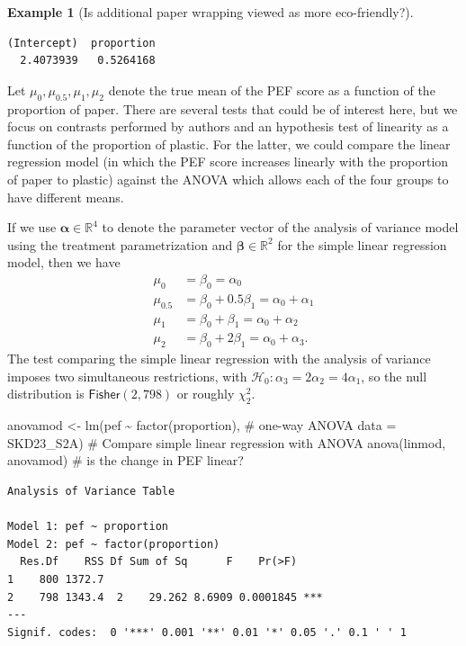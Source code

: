 \documentclass[
  11pt,
  letterpaper,
]{scrbook}
\newenvironment{Shaded}{\begin{snugshade}}{\end{snugshade}}
\newcommand{\AttributeTok}[1]{\textcolor[rgb]{0.40,0.45,0.13}{#1}}
\newcommand{\CommentTok}[1]{\textcolor[rgb]{0.37,0.37,0.37}{#1}}
\newcommand{\FunctionTok}[1]{\textcolor[rgb]{0.28,0.35,0.67}{#1}}
\newcommand{\NormalTok}[1]{\textcolor[rgb]{0.00,0.23,0.31}{#1}}
\newcommand{\OtherTok}[1]{\textcolor[rgb]{0.00,0.23,0.31}{#1}}
\newcommand{\SpecialCharTok}[1]{\textcolor[rgb]{0.37,0.37,0.37}{#1}}
\theoremstyle{definition}
\theoremstyle{definition}
\newtheorem{example}{Example}[chapter]
\theoremstyle{remark}
\begin{document}
\begin{example}[Is additional paper wrapping viewed as more
eco-friendly?]
\begin{verbatim}
(Intercept)  proportion 
  2.4073939   0.5264168 
\end{verbatim}

Let \(\mu_{0}, \mu_{0.5}, \mu_{1}, \mu_2\) denote the true mean of the
PEF score as a function of the proportion of paper. There are several
tests that could be of interest here, but we focus on contrasts
performed by authors and an hypothesis test of linearity as a function
of the proportion of plastic. For the latter, we could compare the
linear regression model (in which the PEF score increases linearly with
the proportion of paper to plastic) against the ANOVA which allows each
of the four groups to have different means.

If we use \(\boldsymbol{\alpha} \in \mathbb{R}^4\) to denote the
parameter vector of the analysis of variance model using the treatment
parametrization and \(\boldsymbol{\beta} \in \mathbb{R}^2\) for the
simple linear regression model, then we have \begin{align*}
\mu_0 &= \beta_0=\alpha_0 \\
\mu_{0.5} &= \beta_0 + 0.5 \beta_1 = \alpha_0 + \alpha_1\\
\mu_1 &= \beta_0 + \beta_1 = \alpha_0 + \alpha_2 \\
\mu_2 &= \beta_0 + 2 \beta_1= \alpha_0 + \alpha_3.
\end{align*} The test comparing the simple linear regression with the
analysis of variance imposes two simultaneous restrictions, with
\(\mathscr{H}_0: \alpha_3 = 2\alpha_2= 4\alpha_1\), so the null
distribution is \(\mathsf{Fisher}(2, 798)\) or roughly \(\chi^2_2\).

\begin{Shaded}
\begin{Highlighting}[]
\NormalTok{anovamod }\OtherTok{\textless{}{-}} \FunctionTok{lm}\NormalTok{(pef }\SpecialCharTok{\textasciitilde{}} \FunctionTok{factor}\NormalTok{(proportion), }\CommentTok{\# one{-}way ANOVA}
               \AttributeTok{data =}\NormalTok{ SKD23\_S2A) }
\CommentTok{\# Compare simple linear regression with ANOVA}
\FunctionTok{anova}\NormalTok{(linmod, anovamod) }\CommentTok{\# is the change in PEF linear?}
\end{Highlighting}
\end{Shaded}

\begin{verbatim}
Analysis of Variance Table

Model 1: pef ~ proportion
Model 2: pef ~ factor(proportion)
  Res.Df    RSS Df Sum of Sq      F    Pr(>F)    
1    800 1372.7                                  
2    798 1343.4  2    29.262 8.6909 0.0001845 ***
---
Signif. codes:  0 '***' 0.001 '**' 0.01 '*' 0.05 '.' 0.1 ' ' 1
\end{verbatim}


\end{example}
\end{document}
